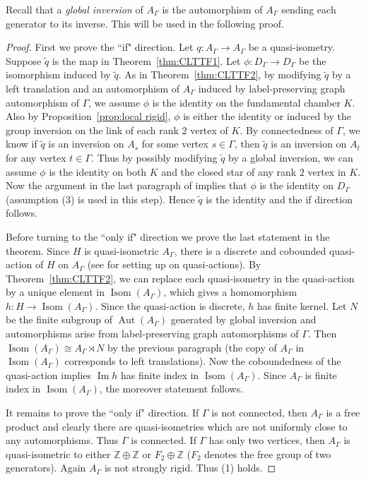 \documentclass[11pt]{amsart}
\newcommand{\Isom}{\operatorname{Isom}}
\newcommand{\Aut}{\operatorname{Aut}}
\theoremstyle{definition}
\newcommand{\im}{\operatorname{Im}}
\begin{document}
Recall that a \emph{global inversion} of $A_\Gamma$ is the automorphism of $A_\Gamma$ sending each generator to its inverse. This will be used in the following proof.
\begin{proof}
First we prove the ``if" direction. Let $q\colon A_\Gamma\to A_\Gamma$ be a quasi-isometry. Suppose $\tilde q$ is the map in Theorem~\ref{thm:CLTTF1}. Let $\phi\colon D_\Gamma\to D_\Gamma$ be the isomorphism induced by $\tilde q$. As in Theorem~\ref{thm:CLTTF2}, by modifying $\tilde q$ by a left translation and an automorphism of $A_\Gamma$ induced by label-preserving graph automorphism of $\Gamma$, we assume $\phi$ is the identity on the fundamental chamber $K$. Also by Proposition~\ref{prop:local rigid}, $\phi$ is either the identity or induced by the group inversion on the link of each rank $2$ vertex of $K$. By connectedness of $\Gamma$, we know if $\tilde q$ is an inversion on $A_s$ for some vertex $s\in\Gamma$, then $\tilde q$ is an inversion on $A_t$ for any vertex $t\in \Gamma$. Thus by possibly modifying $\tilde q$ by a global inversion, we can assume $\phi$ is the identity on both $K$ and the closed star of any rank $2$ vertex in $K$. Now the argument in the last paragraph of \cite[pp. 1436]{MR2174269} implies that $\phi$ is the identity on $D_\Gamma$ (assumption (3) is used in this step). Hence $\tilde q$ is the identity and the if direction follows.

Before turning to the ``only if" direction we prove the last statement in the theorem. Since $H$ is quasi-isometric $A_\Gamma$, there is a discrete and cobounded quasi-action of $H$ on $A_\Gamma$ (see \cite[Section 2]{kleiner2001groups} for setting up on quasi-actions). By Theorem~\ref{thm:CLTTF2}, we can replace each quasi-isometry in the quasi-action by a unique element in $\Isom(A_\Gamma)$, which gives a homomorphism $h\colon H\to \Isom(A_\Gamma)$. Since the quasi-action is discrete, $h$ has finite kernel. Let $N$ be the finite subgroup of $\Aut(A_\Gamma)$ generated by global inversion and automorphisms arise from label-preserving graph automorphisms of $\Gamma$. Then $\Isom(A_\Gamma)\cong A_\Gamma\rtimes N$ by the previous paragraph (the copy of $A_\Gamma$ in $\Isom(A_\Gamma)$ corresponds to left translations). Now the coboundedness of the quasi-action implies $\im h$ has finite index in $\Isom(A_\Gamma)$. Since $A_\Gamma$ is finite index in $\Isom(A_\Gamma)$, the moreover statement follows.

It remains to prove the ``only if" direction. If $\Gamma$ is not connected, then $A_\Gamma$ is a free product and clearly there are quasi-isometries which are not uniformly close to any automorphisms. Thus $\Gamma$ is connected. If $\Gamma$ has only two vertices, then $A_\Gamma$ is quasi-isometric to either $\mathbb Z\oplus\mathbb Z$ or $F_2\oplus\mathbb Z$ ($F_2$ denotes the free group of two generators). Again $A_\Gamma$ is not strongly rigid. Thus (1) holds.


\end{proof}
\end{document}
